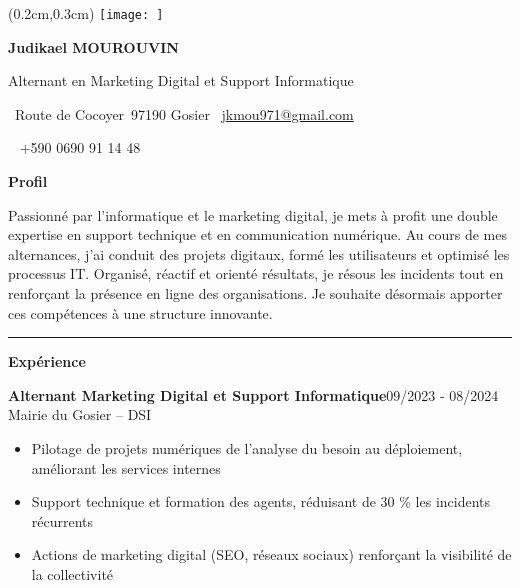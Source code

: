 \documentclass[a4paper]{article}
\renewcommand{\colorbox}[2]{#2}%
\newcommand{\fullrule}{\hspace{-1.5cm}\rule{\paperwidth}{0.4pt}}
\newcommand{\cvsection}[1]{%
  \vspace{6pt}\textbf{\Large #1}\par\vspace{2pt}}
\begin{document}
\color{white}
\ifx\relax\relax\else
\begin{textblock*}{4cm}(0.2cm,0.3cm)
  \texttt{[image: ]}
\end{textblock*}
 \fi
\begin{center}
  {\fontsize{44pt}{24pt}\selectfont\bfseries Judikael MOUROUVIN}

  \bigskip
  {\Large Alternant en Marketing Digital et Support Informatique}

  \bigskip\bigskip
  \faMapMarker~Route de Cocoyer\ 97190 Gosier
  \quad\faEnvelope~\href{mailto:jkmou971@gmail.com}{jkmou971@gmail.com}

  \bigskip
  \faPhone~ +590 0690 91 14 48
  \quad \faLinkedin\ \href{}{}
 

  \vspace{-0.3cm}
  
\end{center}
 \vspace{2cm}
\cvsection{Profil}

Passionné par l’informatique et le marketing digital, je mets à profit une double expertise en support technique et en communication numérique. Au cours de mes alternances, j’ai conduit des projets digitaux, formé les utilisateurs et optimisé les processus IT. Organisé, réactif et orienté résultats, je résous les incidents tout en renforçant la présence en ligne des organisations. Je souhaite désormais apporter ces compétences à une structure innovante.

\medskip\fullrule

\cvsection{Expérience}
\colorbox{maincolor}{%
  \begin{minipage}{\linewidth}
    \noindent
    \textbf{Alternant Marketing Digital et Support Informatique}\hfill 09/2023 - 08/2024\\
    Mairie du Gosier – DSI\\[-0.3em]
    \begin{itemize}[leftmargin=*]
      \item Pilotage de projets numériques de l’analyse du besoin au déploiement, améliorant les services internes \item Support technique et formation des agents, réduisant de 30 \% les incidents récurrents \item Actions de marketing digital (SEO, réseaux sociaux) renforçant la visibilité de la collectivité
    \end{itemize}
  \end{minipage}}
\end{document}
